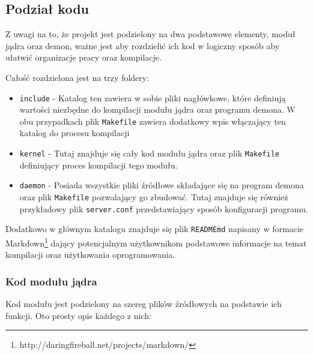 \documentclass[10pt]{scrartcl}
\begin{document}
\subsection{Podział kodu}

Z uwagi na to, że projekt jest podzielony na dwa podstawowe elementy, moduł jądra oraz demon, ważne jest aby rozdzielić ich kod w logiczny sposób aby ułatwić organizacje pracy oraz kompilacje.

Całość rozdzielona jest na trzy foldery:

\begin{itemize}
\itemsep1pt\parskip0pt
\item
  \texttt{include} - Katalog ten zawiera w sobie pliki nagłówkowe, które definiują wartości niezbędne do kompilacji modułu jądra oraz programu demona. W obu przypadkach plik \texttt{Makefile} zawiera dodatkowy wpis włączający ten katalog do procesu kompilacji
\item
  \texttt{kernel} - Tutaj znajduje się cały kod modułu jądra oraz plik
  \texttt{Makefile} definiujący proces kompilacji tego modułu.
\item
  \texttt{daemon} - Posiada wszystkie pliki źródłowe składające się na program demona oraz plik \texttt{Makefile} pozwalający go zbudować.  Tutaj znajduje się również przykładowy plik \texttt{server.conf} przedstawiający sposób konfiguracji programu.
\end{itemize}

Dodatkowo w głównym katalogu znajduje się plik \texttt{README\.md} napisany w formacie Markdown\footnote{http://daringfireball.net/projects/markdown/} dający potencjalnym użytkownikom podstawowe informacje na temat kompilacji oraz użytkowania oprogramowania.

\subsubsection{Kod modułu jądra}

Kod modułu jest podzielony na szereg plików źródłowych na podstawie ich funkcji. Oto prosty opis każdego z nich:
\end{document}
